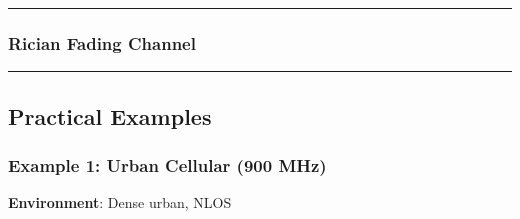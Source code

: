 \begin{center}\rule{0.5\linewidth}{0.5pt}\end{center}

\subsubsection{Rician Fading Channel}\label{rician-fading-channel}

\begin{Shaded}
\begin{Highlighting}[]
\OperatorTok{=} \OperatorTok{**}\OperatorTok{/}\NormalTok{)  }
    
\OperatorTok{=}
    
\OperatorTok{=}\OperatorTok{/}\OperatorTok{+}\NormalTok{))}
    
\OperatorTok{*=} \OperatorTok{/}\OperatorTok{+}\NormalTok{))}
    
    \OperatorTok{+}
\end{Highlighting}
\end{Shaded}

\begin{center}\rule{0.5\linewidth}{0.5pt}\end{center}

\subsection{Practical Examples}\label{practical-examples}

\subsubsection{Example 1: Urban Cellular (900
MHz)}\label{example-1-urban-cellular-900-mhz}

\textbf{Environment}: Dense urban, NLOS

